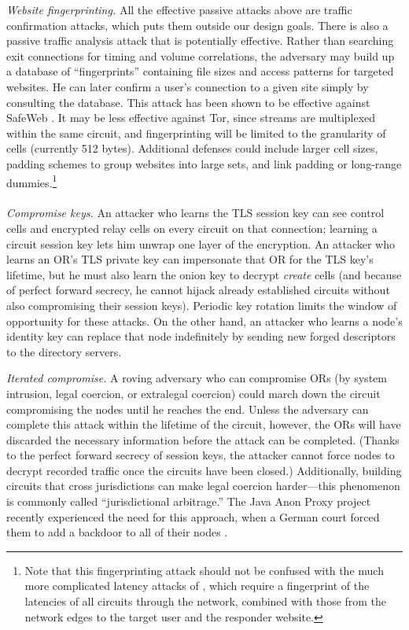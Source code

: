 \documentclass[times,10pt,twocolumn]{article}
\begin{document}
\emph{Website fingerprinting.} All the effective passive
attacks above are traffic confirmation attacks,
which puts them outside our design goals. There is also
a passive traffic analysis attack that is potentially effective.
Rather than searching exit connections for timing and volume
correlations, the adversary may build up a database of
``fingerprints'' containing file sizes and access patterns for
targeted websites. He can later confirm a user's connection to a given
site simply by consulting the database. This attack has
been shown to be effective against SafeWeb \cite{hintz-pet02}.
It may be less effective against Tor, since
streams are multiplexed within the same circuit, and
fingerprinting will be limited to
the granularity of cells (currently 512 bytes). Additional
defenses could include
larger cell sizes, padding schemes to group websites
into large sets, and link
padding or long-range dummies.\footnote{Note that this fingerprinting
attack should not be confused with the much more complicated latency
attacks of \cite{back01}, which require a fingerprint of the latencies
of all circuits through the network, combined with those from the
network edges to the target user and the responder website.}\\

\\
\emph{Compromise keys.} An attacker who learns the TLS session key can
see control cells and encrypted relay cells on every circuit on that
connection; learning a circuit
session key lets him unwrap one layer of the encryption. An attacker
who learns an OR's TLS private key can impersonate that OR for the TLS
key's lifetime, but he must
also learn the onion key to decrypt \emph{create} cells (and because of
perfect forward secrecy, he cannot hijack already established circuits
without also compromising their session keys). Periodic key rotation
limits the window of opportunity for these attacks. On the other hand,
an attacker who learns a node's identity key can replace that node
indefinitely by sending new forged descriptors to the directory servers.

\emph{Iterated compromise.} A roving adversary who can
compromise ORs (by system intrusion, legal coercion, or extralegal
coercion) could march down the circuit compromising the
nodes until he reaches the end.  Unless the adversary can complete
this attack within the lifetime of the circuit, however, the ORs
will have discarded the necessary information before the attack can
be completed.  (Thanks to the perfect forward secrecy of session
keys, the attacker cannot force nodes to decrypt recorded
traffic once the circuits have been closed.)  Additionally, building
circuits that cross jurisdictions can make legal coercion
harder---this phenomenon is commonly called ``jurisdictional
arbitrage.'' The Java Anon Proxy project recently experienced the
need for this approach, when
a German court forced them to add a backdoor to
all of their nodes \cite{jap-backdoor}.
\end{document}
